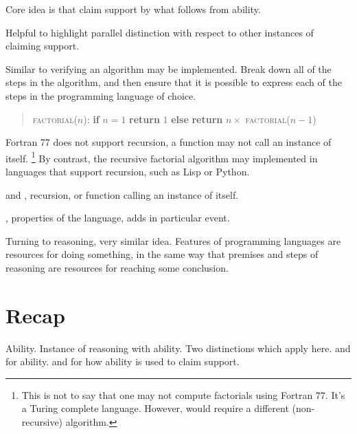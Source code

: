 \begin{note}
  Core idea is that claim support by what follows from ability.

  Helpful to highlight parallel distinction with respect to other instances of claiming support.
\end{note}

\begin{note}
  Similar to verifying an algorithm may be implemented.
  Break down all of the steps in the algorithm, and then ensure that it is possible to express each of the steps in the programming language of choice.

  \begin{quote}
    \textsc{factorial}(\(n\)):\newline
    \textbf{if} \(n = 1\)\newline
    \mbox{}\indent \textbf{return} \(1\)\newline
    \textbf{else}\newline
    \mbox{}\indent \textbf{return} \(n \times\) \textsc{factorial}(\(n-1\))
  \end{quote}

  Fortran 77 does not support recursion, a function may not call an instance of itself.\nolinebreak
  \footnote{
    This is not to say that one may not compute factorials using Fortran 77.
    It's a Turing complete language.
    However, would require a different (non-recursive) algorithm.
  }
  By contrast, the recursive factorial algorithm may implemented in languages that support recursion, such as Lisp or Python.

  \adA{} and \adB{}, recursion, or function calling an instance of itself.

  \AR{}, properties of the language, \WR{} adds in particular event.
\end{note}

\begin{note}
  Turning to reasoning, very similar idea.
  Features of programming languages are resources for doing something, in the same way that premises and steps of reasoning are resources for reaching some conclusion.
\end{note}

\section{Recap}
\label{sec:recap-reasoning}

\begin{note}
  Ability.
  Instance of reasoning with ability.
  Two distinctions which apply here.
  \AR{} and \WR{} for ability.
  \adB{} and \adA{} for how ability is used to claim support.
\end{note}

